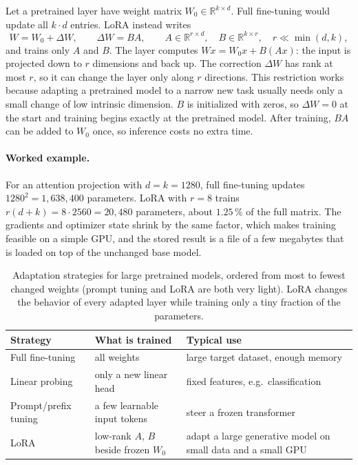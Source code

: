 Let a pretrained layer have weight matrix $W_0\in\mathbb R^{k\times d}$. Full
fine-tuning would update all $k\cdot d$ entries. LoRA instead writes
\begin{equation}
  W = W_0 + \Delta W,\qquad \Delta W = BA,\qquad
  A\in\mathbb R^{r\times d},\quad B\in\mathbb R^{k\times r},\quad
  r\ll\min(d,k),
  \label{eq:lora}
\end{equation}
\noindent
and trains only $A$ and $B$. The layer computes
$Wx=W_0x+B(Ax)$: the input is projected down to $r$ dimensions and back up.
The correction $\Delta W$ has rank at most $r$, so it can change the layer
only along $r$ directions. This restriction works because adapting a
pretrained model to a narrow new task usually needs only a small change of
low intrinsic dimension. $B$ is initialized with zeros, so $\Delta W=0$ at the
start and training begins exactly at the pretrained model. After training,
$BA$ can be added to $W_0$ once, so inference costs no extra time.

\paragraph{Worked example.}
For an attention projection with $d=k=1280$, full fine-tuning updates
$1280^2=1{,}638{,}400$ parameters. LoRA with $r=8$ trains
$r(d+k)=8\cdot2560=20{,}480$ parameters, about $1.25\,\%$ of the full matrix.
The gradients and optimizer state shrink by the same factor, which makes
training feasible on a simple GPU, and the stored result is a file of a few
megabytes that is loaded on top of the unchanged base model.

\begin{table}[ht]
  \centering
  \begin{tabular}{@{}p{3.2cm}p{4.6cm}p{6.0cm}@{}}
    \toprule
    Strategy & What is trained & Typical use \\
    \midrule
    Full fine-tuning & all weights & large target dataset, enough memory \\
    Linear probing & only a new linear head & fixed features, e.g.\
      classification \\
    Prompt/prefix tuning & a few learnable input tokens & steer a frozen
      transformer \\
    LoRA & low-rank $A$, $B$ beside frozen $W_0$ & adapt a large generative
      model on small data and a small GPU \\
    \bottomrule
  \end{tabular}
  \caption{Adaptation strategies for large pretrained models, ordered from
  most to fewest changed weights (prompt tuning and LoRA are both very
  light). LoRA changes the behavior of every adapted layer while training
  only a tiny fraction of the parameters.}
  \label{tab:adaptation}
\end{table}

